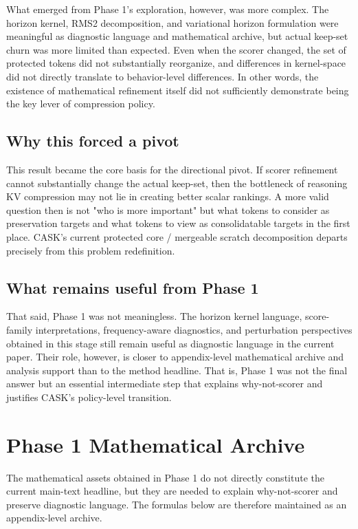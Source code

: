 What emerged from Phase 1's exploration, however, was more complex. The horizon kernel, RMS2 decomposition, and variational horizon formulation were meaningful as diagnostic language and mathematical archive, but actual keep-set churn was more limited than expected. Even when the scorer changed, the set of protected tokens did not substantially reorganize, and differences in kernel-space did not directly translate to behavior-level differences. In other words, the existence of mathematical refinement itself did not sufficiently demonstrate being the key lever of compression policy.


\subsection{Why this forced a pivot}


This result became the core basis for the directional pivot. If scorer refinement cannot substantially change the actual keep-set, then the bottleneck of reasoning KV compression may not lie in creating better scalar rankings. A more valid question then is not "who is more important" but what tokens to consider as preservation targets and what tokens to view as consolidatable targets in the first place. CASK's current protected core / mergeable scratch decomposition departs precisely from this problem redefinition.


\subsection{What remains useful from Phase 1}


That said, Phase 1 was not meaningless. The horizon kernel language, score-family interpretations, frequency-aware diagnostics, and perturbation perspectives obtained in this stage still remain useful as diagnostic language in the current paper. Their role, however, is closer to appendix-level mathematical archive and analysis support than to the method headline. That is, Phase 1 was not the final answer but an essential intermediate step that explains why-not-scorer and justifies CASK's policy-level transition.


\section{Phase 1 Mathematical Archive}


The mathematical assets obtained in Phase 1 do not directly constitute the current main-text headline, but they are needed to explain why-not-scorer and preserve diagnostic language. The formulas below are therefore maintained as an appendix-level archive.


